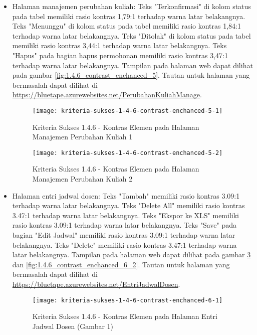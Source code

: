 \begin{itemize}
    \item Halaman manajemen perubahan kuliah: Teks "Terkonfirmasi" di kolom status pada tabel memiliki rasio kontras 1,79:1 terhadap warna latar belakangnya. Teks "Menunggu" di kolom status pada tabel memiliki rasio kontras 1,84:1 terhadap warna latar belakangnya. Teks "Ditolak" di kolom status pada tabel memiliki rasio kontras 3,44:1 terhadap warna latar belakangnya. Teks "Hapus" pada bagian hapus permohonan memiliki rasio kontras 3,47:1 terhadap warna latar belakangnya. Tampilan pada halaman web dapat dilihat pada gambar \ref{fig:1.4.6_contrast_enchanced_5}. Tautan untuk halaman yang bermasalah dapat dilihat di \url{https://bluetape.azurewebsites.net/PerubahanKuliahManage}.
    \begin{figure}[H]
        \centering  
        \texttt{[image: kriteria-sukses-1-4-6-contrast-enchanced-5-1]}  
        \caption[Kriteria Sukses 1.4.6 - Kontras Elemen pada Halaman Manajemen Perubahan Kuliah]{Kriteria Sukses 1.4.6 - Kontras Elemen pada Halaman Manajemen Perubahan Kuliah 1}
        \label{fig:1.4.6_contrast_enchanced_5_1}  
    \end{figure} 
    
    \begin{figure}[H]
        \centering  
        \texttt{[image: kriteria-sukses-1-4-6-contrast-enchanced-5-2]}  
        \caption[Kriteria Sukses 1.4.6 - Kontras Elemen pada Halaman Manajemen Perubahan Kuliah]{Kriteria Sukses 1.4.6 - Kontras Elemen pada Halaman Manajemen Perubahan Kuliah 2}
        \label{fig:1.4.6_contrast_enchanced_5_2}  
    \end{figure}

    \item Halaman entri jadwal dosen: Teks "Tambah" memiliki rasio kontras 3.09:1 terhadap warna latar belakangnya. Teks "Delete All" memiliki rasio kontras 3.47:1 terhadap warna latar belakangnya. Teks "Ekspor ke XLS" memiliki rasio kontras 3.09:1 terhadap warna latar belakangnya. Teks "Save" pada bagian "Edit Jadwal" memiliki rasio kontras 3.09:1 terhadap warna latar belakangnya. Teks "Delete" memiliki rasio kontras 3.47:1 terhadap warna latar belakangnya. Tampilan pada halaman web dapat dilihat pada gambar \ref{fig:1.4.6_contrast_enchanced_6_1} dan \ref{fig:1.4.6_contrast_enchanced_6_2}. Tautan untuk halaman yang bermasalah dapat dilihat di \url{https://bluetape.azurewebsites.net/EntriJadwalDosen}.
    \begin{figure}[H]
        \centering  
        \texttt{[image: kriteria-sukses-1-4-6-contrast-enchanced-6-1]}  
        \caption[Kriteria Sukses 1.4.6 - Kontras Elemen pada Halaman Entri Jadwal Dosen (Gambar 1)]{Kriteria Sukses 1.4.6 - Kontras Elemen pada Halaman Entri Jadwal Dosen (Gambar 1)}
        \label{fig:1.4.6_contrast_enchanced_6_1}  
    \end{figure} 
    

\end{itemize}
